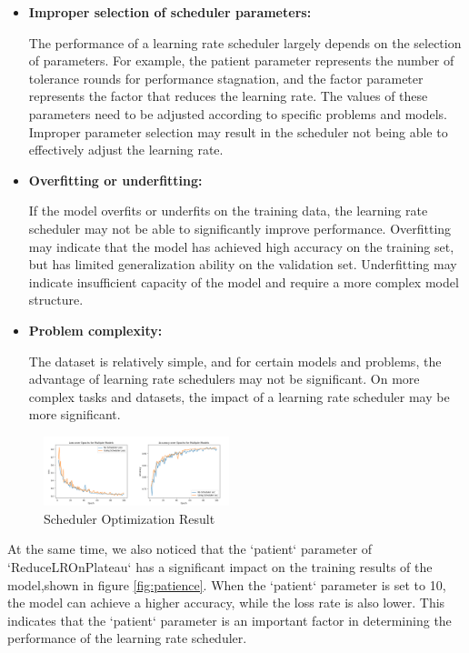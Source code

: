 \documentclass[twocolumn]{article}
\begin{document}
    \begin{itemize}
        \item \textbf{Improper selection of scheduler parameters:} 
        
        The performance of a learning rate scheduler largely depends on the selection of parameters. For example, the patient parameter represents the number of tolerance rounds for performance stagnation, and the factor parameter represents the factor that reduces the learning rate. The values of these parameters need to be adjusted according to specific problems and models. Improper parameter selection may result in the scheduler not being able to effectively adjust the learning rate.
        
        \item \textbf{Overfitting or underfitting:} 
        
        If the model overfits or underfits on the training data, the learning rate scheduler may not be able to significantly improve performance. Overfitting may indicate that the model has achieved high accuracy on the training set, but has limited generalization ability on the validation set. Underfitting may indicate insufficient capacity of the model and require a more complex model structure.
        
        \item \textbf{Problem complexity:} 
        
        The dataset is relatively simple, and for certain models and problems, the advantage of learning rate schedulers may not be significant. On more complex tasks and datasets, the impact of a learning rate scheduler may be more significant.
        
    \end{itemize}

    
    \begin{figure}[h]
        \centering
        \includegraphics[width=0.48\textwidth]{Scheduler Optimization Result.png}
        \caption{Scheduler Optimization Result}
        \label{fig:scheduler_result}
    \end{figure}

    At the same time, we also noticed that the `patient` parameter of `ReduceLROnPlateau` has a significant impact on the training results of the model,shown in figure \ref{fig:patience}. When the `patient` parameter is set to 10, the model can achieve a higher accuracy, while the loss rate is also lower. This indicates that the `patient` parameter is an important factor in determining the performance of the learning rate scheduler.
\end{document}
